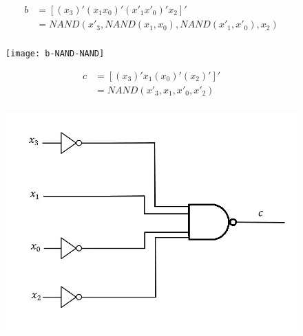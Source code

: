 \documentclass{article}
\begin{document}
\begin{equation*}
\begin{split}
b & = [ (x_3)' (x_1 x_0)' (x'_1 x'_0)' x_2 ]' \\
  & = NAND(x'_3, NAND(x_1, x_0), NAND(x'_1, x'_0), x_2) \\
\end{split}
\end{equation*}
\clearpage
\begin{figure}[ht]
\centering
\texttt{[image: b-NAND-NAND]}
\end{figure}


\begin{equation*}
\begin{split}
c & = [ (x_3)' x_1 (x_0)' (x_2)' ]' \\ 
  & = NAND(x'_3, x_1, x'_0, x'_2) \\
\end{split}
\end{equation*}
\begin{figure}[h!]
\centering
\includegraphics[scale=0.25]{c-NAND-NAND}
\end{figure}
\end{document}

